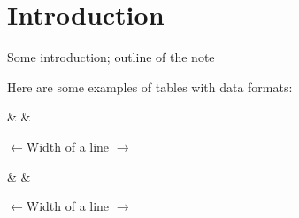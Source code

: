 \section{Introduction}\label{sec:Introduction}

Some introduction; outline of the note

Here are some examples of tables with data formats:

\begin{table}[htb]
  \caption{Example of a table for a 32-bit format}\label{tab:test1}
    \begin{bittabular}{32}
      & \bitNumFourByte
      & \bitNumFourByte
    \end{bittabular}
\end{table}

$\leftarrow$\hfill Width of a line \hfill$\rightarrow$

\begin{landscape}
\begin{table}[htb]
  \caption{Example of a table for a 64-bit format}\label{tab:test2}
    \begin{bittabular}{64}
      & \bitNumEightByte
      & \bitNumEightByte
    \end{bittabular}
\end{table}

$\leftarrow$\hfill Width of a line \hfill$\rightarrow$

\end{landscape}




